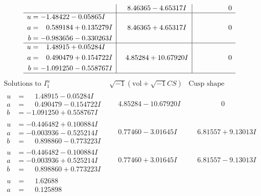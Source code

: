 \documentclass[1p]{elsarticle_modified}
\theoremstyle{definition}
\newcommand{\I}{\sqrt{-1}}
\begin{document}
$$\begin{array}{c|c|c}
 & \phantom{-}8.46365 - 4.65317 I & \phantom{-0.000000 } 0 \\ \hline\begin{aligned}
u &= -1.48422 - 0.05865 I \\
a &= \phantom{-}0.589184 + 0.135279 I \\
b &= -0.983656 - 0.330263 I\end{aligned}
 & \phantom{-}8.46365 + 4.65317 I & \phantom{-0.000000 } 0 \\ \hline\begin{aligned}
u &= \phantom{-}1.48915 + 0.05284 I \\
a &= \phantom{-}0.490479 + 0.154722 I \\
b &= -1.091250 - 0.558767 I\end{aligned}
 & \phantom{-}4.85284 + 10.67920 I & \phantom{-0.000000 } 0\\
 \hline 
 \end{array}$$\newpage$$\begin{array}{c|c|c}  
\text{Solutions to }I^u_{1}& \I (\text{vol} + \sqrt{-1}CS) & \text{Cusp shape}\\
 \hline 
\begin{aligned}
u &= \phantom{-}1.48915 - 0.05284 I \\
a &= \phantom{-}0.490479 - 0.154722 I \\
b &= -1.091250 + 0.558767 I\end{aligned}
 & \phantom{-}4.85284 - 10.67920 I & \phantom{-0.000000 } 0 \\ \hline\begin{aligned}
u &= -0.446482 + 0.100884 I \\
a &= -0.003936 - 0.525214 I \\
b &= \phantom{-}0.898860 - 0.773223 I\end{aligned}
 & \phantom{-}0.77460 - 3.01645 I & \phantom{-}6.81557 + 9.13013 I \\ \hline\begin{aligned}
u &= -0.446482 - 0.100884 I \\
a &= -0.003936 + 0.525214 I \\
b &= \phantom{-}0.898860 + 0.773223 I\end{aligned}
 & \phantom{-}0.77460 + 3.01645 I & \phantom{-}6.81557 - 9.13013 I \\ \hline\begin{aligned}
u &= \phantom{-}1.62688\phantom{ +0.000000I} \\
a &= \phantom{-}0.125898\phantom{ +0.000000I} \\

\end{aligned}
\end{array}$$
\end{document}
